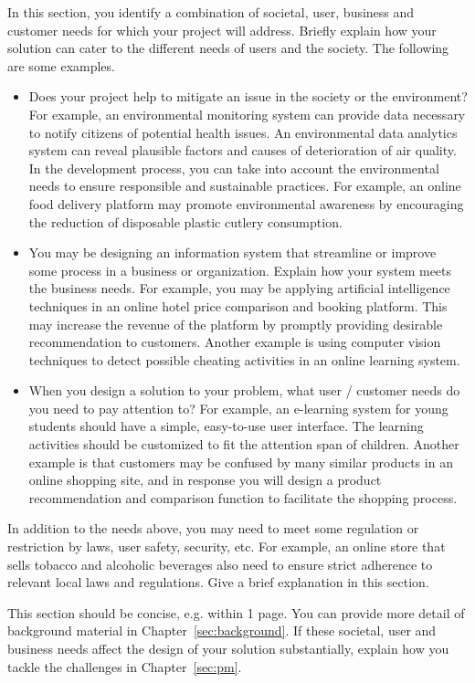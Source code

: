 \documentclass[11pt,a4paper]{article}
\begin{document}
In this section, you identify a combination of societal, user, business and customer needs for which your project will address. Briefly explain how your solution can cater to the different needs of users and the society. The following are some examples.
\begin{itemize}
  \item Does your project help to mitigate an issue in the society or the environment? For example, an environmental monitoring system can provide data necessary to notify citizens of potential health issues. An environmental data analytics system can reveal plausible factors and causes of deterioration of air quality. In the development process, you can take into account the environmental needs to ensure responsible and sustainable practices. For example, an online food delivery platform may promote environmental awareness by encouraging the reduction of disposable plastic cutlery consumption.
  \item You may be designing an information system that streamline or improve some process in a business or organization. Explain how your system meets the business needs. For example, you may be applying artificial intelligence techniques in an online hotel price comparison and booking platform. This may increase the revenue of the platform by promptly providing desirable recommendation to customers. Another example is using computer vision techniques to detect possible cheating activities in an online learning system.
  \item When you design a solution to your problem, what user / customer needs do you need to pay attention to? For example, an e-learning system for young students should have a simple, easy-to-use user interface. The learning activities should be customized to fit the attention span of children. Another example is that customers may be confused by many similar products in an online shopping site, and in response you will design a product recommendation and comparison function to facilitate the shopping process.
\end{itemize}

In addition to the needs above, you may need to meet some regulation or restriction by laws, user safety, security, etc. For example, an online store that sells tobacco and alcoholic beverages also need to ensure strict adherence to relevant local laws and regulations. Give a brief explanation in this section.

This section should be concise, e.g. within 1 page. You can provide more detail of background material in Chapter~\ref{sec:background}. If these societal, user and business needs affect the design of your solution substantially, explain how you tackle the challenges in Chapter~\ref{sec:pm}.
\end{document}
